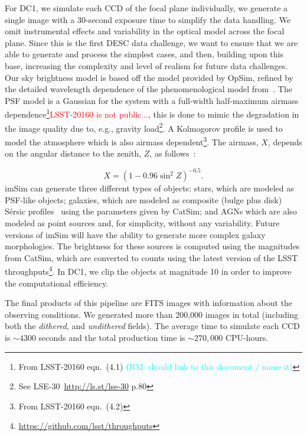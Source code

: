 \documentclass[twocolumn]{aastex62}
\newcommand{\rachel}[1]{{\textcolor{cyan}{{\textbf (RM: #1)}}}}
\begin{document}
For DC1, we simulate each CCD of the focal plane individually, we generate a single image with a 30-second exposure time to simplify the data handling. We omit instrumental effects and variability in the optical model across the focal plane. Since this is the first DESC data challenge, we want to ensure that we are able to generate and process the simplest cases, and then, building upon this base, increasing the complexity and level of realism for future data challenges. Our sky brightness model is based off the \citet{1991PASP..103.1033K} model provided by OpSim, refined by the detailed wavelength dependence of the phenomenological model from~\citet{2016SPIE.9910E..1AY}. The PSF model is a Gaussian for the system with a full-width half-maximum airmass dependence\footnote{From LSST-20160 eqn.~(4.1) \rachel{should link to this document / name it}}\textcolor{red}{LSST-20160 is not public...}, this is done to mimic the degradation in the image quality due to, e.g., gravity load\footnote{See LSE-30~\url{http://ls.st/lse-30} p.80}. A Kolmogorov profile is used to model the atmosphere which is also airmass dependent\footnote{From LSST-20160 eqn.~(4.2)}. The airmass, $X$, depends on the angular distance to the zenith, $Z$, as follows~\citep{1991PASP..103.1033K}:

\begin{equation}
X = (1 - 0.96\sin^{2}{Z})^{-0.5}.
\end{equation}
imSim can generate three different types of objects: stars, which are modeled as PSF-like objects; galaxies, which are modeled as composite (bulge plus disk) S\'{e}rsic profiles~\citep{1963BAAA....6...41S} using
the parameters given by CatSim; and AGNs which are also modeled as point sources and, for simplicity, without any variability. Future versions of imSim will have the ability to generate more complex galaxy morphologies. The brightness for these sources is computed using the magnitudes from CatSim, which are converted to counts using the latest version of the LSST throughputs\footnote{\url{https://github.com/lsst/throughputs}}. In DC1, we clip the objects at magnitude 10 in order to improve the computational efficiency.

The final products of this pipeline are FITS images with information about the observing conditions. We generated more than 200,000 images in total (including both the \textit{dithered}, and \textit{undithered} fields). The average time to simulate each CCD is $\sim 4300$ seconds and the total production time is $\sim 270,000$ CPU-hours.
\end{document}
